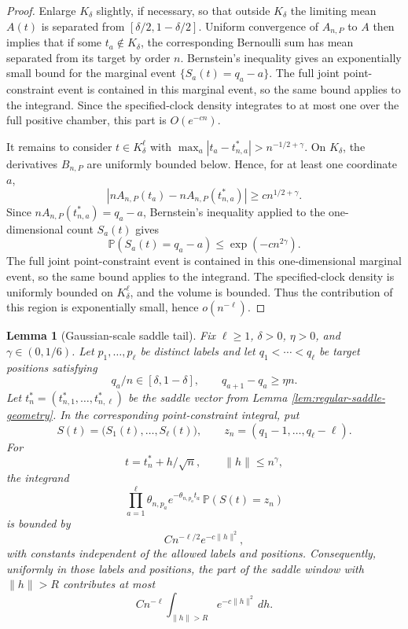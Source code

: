 \documentclass[11pt]{article}
\newtheorem{lemma}[theorem]{Lemma}
\theoremstyle{remark}
\newcommand{\Pp}{\mathbb P}
\newcommand{\dd}{\,d}
\begin{document}
\begin{proof}
Enlarge \(K_\delta\) slightly, if necessary, so that outside \(K_\delta\) the limiting mean \(A(t)\) is separated from \([\delta/2,1-\delta/2]\).  Uniform convergence of \(A_{n,P}\) to \(A\) then implies that if some \(t_a\notin K_\delta\), the corresponding Bernoulli sum has mean separated from its target by order \(n\).  Bernstein's inequality gives an exponentially small bound for the marginal event \(\{S_a(t)=q_a-a\}\).  The full joint point-constraint event is contained in this marginal event, so the same bound applies to the integrand.  Since the specified-clock density integrates to at most one over the full positive chamber, this part is \(O(e^{-c n})\).

It remains to consider \(t\in K_\delta^\ell\) with \(\max_a |t_a-t_{n,a}^*|>n^{-1/2+\gamma}\).  On \(K_\delta\), the derivatives \(B_{n,P}\) are uniformly bounded below.  Hence, for at least one coordinate \(a\),
\[
        |nA_{n,P}(t_a)-nA_{n,P}(t_{n,a}^*)|
        \ge c n^{1/2+\gamma}.
\]
Since \(nA_{n,P}(t_{n,a}^*)=q_a-a\), Bernstein's inequality applied to the one-dimensional count \(S_a(t)\) gives
\[
        \Pp(S_a(t)=q_a-a)\le \exp(-c n^{2\gamma}).
\]
The full joint point-constraint event is contained in this one-dimensional marginal event, so the same bound applies to the integrand.  The specified-clock density is uniformly bounded on \(K_\delta^\ell\), and the volume is bounded.  Thus the contribution of this region is exponentially small, hence \(o(n^{-\ell})\).
\end{proof}


\begin{lemma}[Gaussian-scale saddle tail]\label{lem:regular-gaussian-tail}
Fix \(\ell\ge1\), \(\delta>0\), \(\eta>0\), and \(\gamma\in(0,1/6)\).  Let \(p_1,\ldots,p_\ell\) be distinct labels and let
\(q_1<\cdots<q_\ell\) be target positions satisfying
\[
        q_a/n\in[\delta,1-\delta],\qquad q_{a+1}-q_a\ge \eta n .
\]
Let \(t_n^*=(t_{n,1}^*,\ldots,t_{n,\ell}^*)\) be the saddle vector from Lemma \ref{lem:regular-saddle-geometry}.  In the corresponding point-constraint integral, put
\[
        S(t)=\bigl(S_1(t),\ldots,S_\ell(t)\bigr),
        \qquad z_n=(q_1-1,\ldots,q_\ell-\ell).
\]
For
\[
        t=t_n^*+h/\sqrt n,\qquad \|h\|\le n^\gamma,
\]
the integrand
\[
        \prod_{a=1}^\ell\theta_{n,p_a}e^{-\theta_{n,p_a}t_a}\,
        \Pp(S(t)=z_n)
\]
is bounded by
\[
        C n^{-\ell/2}e^{-c\|h\|^2},
\]
with constants independent of the allowed labels and positions.  Consequently, uniformly in those labels and positions, the part of the saddle window with \(\|h\|>R\) contributes at most
\[
        C n^{-\ell}\int_{\|h\|>R}e^{-c\|h\|^2}\dd h .
\]
\end{lemma}
\end{document}
